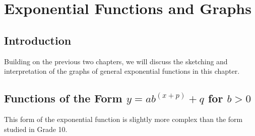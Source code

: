 \chapter{Exponential Functions and Graphs}
\label{m:fg:e11}

\section{Introduction}
Building on the previous two chapters, we will discuss the sketching
and interpretation of the graphs of general exponential functions in
this chapter.



\section{Functions of the Form $y=ab^{(x+p)} + q$ for $b> 0$}
This form of the exponential function is slightly more complex than the form studied in Grade 10.

